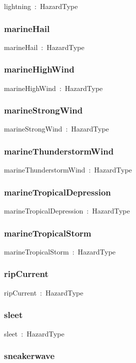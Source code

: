 \documentclass{article}
\begin{document}
lightning~:~HazardType

\subsubsection*{marineHail}

marineHail~:~HazardType

\subsubsection*{marineHighWind}

marineHighWind~:~HazardType

\subsubsection*{marineStrongWind}

marineStrongWind~:~HazardType

\subsubsection*{marineThunderstormWind}

marineThunderstormWind~:~HazardType

\subsubsection*{marineTropicalDepression}

marineTropicalDepression~:~HazardType

\subsubsection*{marineTropicalStorm}

marineTropicalStorm~:~HazardType

\subsubsection*{ripCurrent}

ripCurrent~:~HazardType

\subsubsection*{sleet}

sleet~:~HazardType

\subsubsection*{sneakerwave}
\end{document}
